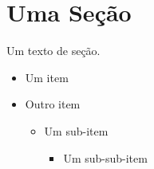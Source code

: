 \section{Uma Seção}

Um texto de seção.
    
    \begin{itemize}
        \item Um item
        \item Outro item
        \begin{itemize}
            \item Um sub-item
            \begin{itemize}
                \item Um sub-sub-item
            \end{itemize}
        \end{itemize}
    \end{itemize}